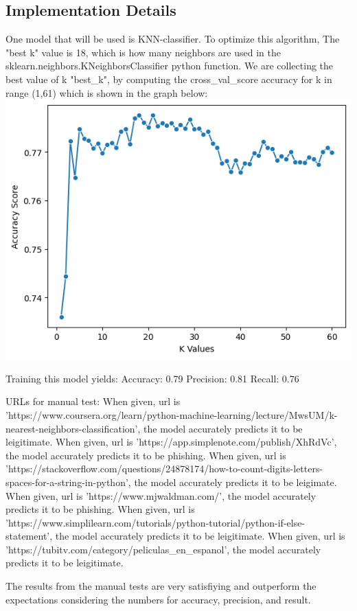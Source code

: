 \documentclass[conference]{IEEEtran}
\begin{document}
\subsection{Implementation Details}
One model that will be used is KNN-classifier. To optimize this algorithm, The "best k" value is 18, which is how many neighbors are used in the sklearn.neighbors.KNeighborsClassifier python function. We are collecting the best value of k "best_k", by computing the cross_val_score accuracy for k in range (1,61) which is shown in the graph below:
\includegraphics{best-k-value.png}

Training this model yields:
Accuracy: 0.79
Precision: 0.81
Recall: 0.76

URLs for manual test:
When given, url is 'https://www.coursera.org/learn/python-machine-learning/lecture/MwsUM/k-nearest-neighbors-classification', the model accurately predicts it to be leigitimate.
When given, url is 'https://app.simplenote.com/publish/XhRdVc', the model accurately predicts it to be phishing.
When given, url is 'https://stackoverflow.com/questions/24878174/how-to-count-digits-letters-spaces-for-a-string-in-python', the model accurately predicts it to be leigimate.
When given, url is 'https://www.mjwaldman.com/', the model accurately predicts it to be phishing.
When given, url is 'https://www.simplilearn.com/tutorials/python-tutorial/python-if-else-statement', the model accurately predicts it to be leigitimate.
When given, url is 'https://tubitv.com/category/peliculas_en_espanol', the model accurately predicts it to be leigitimate.

The results from the manual tests are very satisfiying and outperform the expectations considering the numbers for accuracy, precision, and result. 
\end{document}
